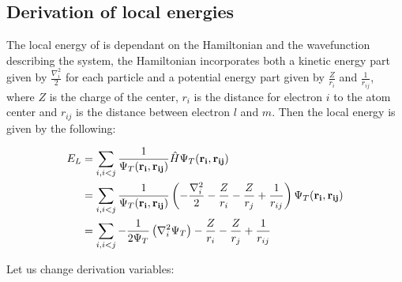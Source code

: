 \documentclass[11pt]{article}
\begin{document}
	


	\subsection{Derivation of local energies}
		The local energy of is dependant on the Hamiltonian and the wavefunction describing the system, the Hamiltonian incorporates both a kinetic energy part given by \( \frac{\nabla_i^2}{2} \) for each particle
		and a potential energy part given by \(\frac{Z}{r_i}\) and \(\frac{1}{r_{ij}}\), where \(Z\) is the charge of the center, \(r_i\) is the distance for electron \(i\) to the atom center and \(r_{ij}\) is the distance between electron \(l\) and \(m\). Then the local energy is given by the following:

		\begin{align}
			E_L &= \sum_{i,i<j}{\frac{1}{ \Psi_T(\vb{r_i} , \vb{r_{ij}}) } \hat{H} \Psi_T(\vb{r_i} , \vb{r_{ij}})}
			\\
			&=	\sum_{i,i<j}\frac{1}{ \Psi_T(\vb{r_i} , \vb{r_{ij}}) } \left( - \frac{\nabla_i^2}{2} -\frac{Z}{r_i}  -  \frac{Z}{r_j} +  \frac{1}{r_{ij} }  \right) \Psi_T(\vb{r_i} , \vb{r_{ij}})
			\\
			&= \sum_{i,i<j}{-\frac{1}{2\Psi_T} \left(\nabla_i^2 \Psi_T  \right)  -\frac{Z}{r_i}  -  \frac{Z}{r_j} +  \frac{1}{r_{ij} }}
		\end{align}

		Let us change derivation variables:
\end{document}
